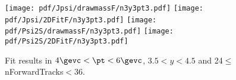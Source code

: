 \begin{figure}[H]
\begin{center}
\texttt{[image: pdf/Jpsi/drawmassF/n3y3pt3.pdf]}
\texttt{[image: pdf/Jpsi/2DFitF/n3y3pt3.pdf]}
\vspace*{-0.5cm}
\texttt{[image: pdf/Psi2S/drawmassF/n3y3pt3.pdf]}
\texttt{[image: pdf/Psi2S/2DFitF/n3y3pt3.pdf]}
\vspace*{-0.5cm}
\end{center}
\caption{Fit results in $4\gevc<\pt<6\gevc$, $3.5<y<4.5$ and 24$\leq$nForwardTracks$<$36.}
\label{Fitn3y3pt3}
\end{figure}
